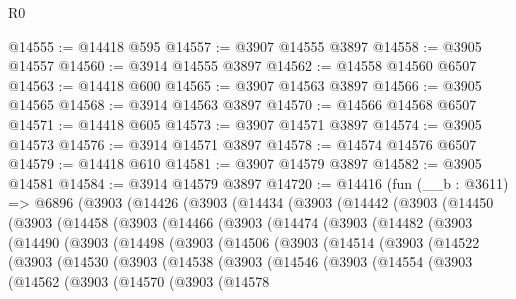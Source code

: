 \begin{lexlean}{R0}
\begin{coremodule}
@14555 := @14418 @595
@14557 := @3907 @14555 @3897
@14558 := @3905 @14557
@14560 := @3914 @14555 @3897
@14562 := @14558 @14560 @6507
@14563 := @14418 @600
@14565 := @3907 @14563 @3897
@14566 := @3905 @14565
@14568 := @3914 @14563 @3897
@14570 := @14566 @14568 @6507
@14571 := @14418 @605
@14573 := @3907 @14571 @3897
@14574 := @3905 @14573
@14576 := @3914 @14571 @3897
@14578 := @14574 @14576 @6507
@14579 := @14418 @610
@14581 := @3907 @14579 @3897
@14582 := @3905 @14581
@14584 := @3914 @14579 @3897
@14720 := @14416
    (fun (__b : @3611) =>
    @6896
      (@3903
        (@14426
          (@3903
            (@14434
              (@3903
                (@14442
                  (@3903
                    (@14450
                      (@3903
                        (@14458
                          (@3903
                            (@14466
                              (@3903
                                (@14474
                                  (@3903
                                    (@14482
                                      (@3903
                                        (@14490
                                          (@3903
                                            (@14498
                                              (@3903
                                                (@14506
                                                  (@3903
                                                    (@14514
                                                      (@3903
                                                        (@14522
                                                          (@3903
                                                            (@14530
                                                              (@3903
                                                                (@14538
                                                                  (@3903
                                                                    (@14546
                                                                      (@3903
                                                                        (@14554
                                                                          (@3903
                                                                            (@14562
                                                                              (@3903
                                                                                (@14570
                                                                                  (@3903
                                                                                    (@14578

\end{coremodule}
\end{lexlean}
